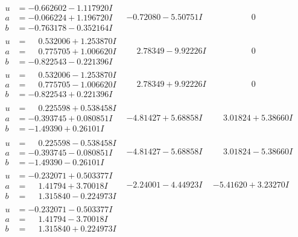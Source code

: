 \documentclass[1p]{elsarticle_modified}
\theoremstyle{definition}
\begin{document}
$$\begin{array}{c|c|c}
\begin{aligned}
u &= -0.662602 - 1.117920 I \\
a &= -0.066224 + 1.196720 I \\
b &= -0.763178 - 0.352164 I\end{aligned}
 & -0.72080 - 5.50751 I & \phantom{-0.000000 } 0 \\ \hline\begin{aligned}
u &= \phantom{-}0.532006 + 1.253870 I \\
a &= \phantom{-}0.775705 + 1.006620 I \\
b &= -0.822543 - 0.221396 I\end{aligned}
 & \phantom{-}2.78349 - 9.92226 I & \phantom{-0.000000 } 0 \\ \hline\begin{aligned}
u &= \phantom{-}0.532006 - 1.253870 I \\
a &= \phantom{-}0.775705 - 1.006620 I \\
b &= -0.822543 + 0.221396 I\end{aligned}
 & \phantom{-}2.78349 + 9.92226 I & \phantom{-0.000000 } 0 \\ \hline\begin{aligned}
u &= \phantom{-}0.225598 + 0.538458 I \\
a &= -0.393745 + 0.080851 I \\
b &= -1.49390 + 0.26101 I\end{aligned}
 & -4.81427 + 5.68858 I & \phantom{-}3.01824 + 5.38660 I \\ \hline\begin{aligned}
u &= \phantom{-}0.225598 - 0.538458 I \\
a &= -0.393745 - 0.080851 I \\
b &= -1.49390 - 0.26101 I\end{aligned}
 & -4.81427 - 5.68858 I & \phantom{-}3.01824 - 5.38660 I \\ \hline\begin{aligned}
u &= -0.232071 + 0.503377 I \\
a &= \phantom{-}1.41794 + 3.70018 I \\
b &= \phantom{-}1.315840 - 0.224973 I\end{aligned}
 & -2.24001 - 4.44923 I & -5.41620 + 3.23270 I \\ \hline\begin{aligned}
u &= -0.232071 - 0.503377 I \\
a &= \phantom{-}1.41794 - 3.70018 I \\
b &= \phantom{-}1.315840 + 0.224973 I\end{aligned}

\end{array}$$
\end{document}
